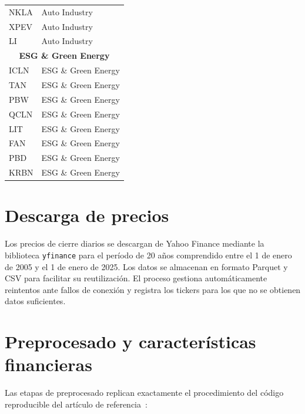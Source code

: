 \begin{longtable}{ll}
NKLA & Auto Industry \\
XPEV & Auto Industry \\
LI   & Auto Industry \\
\multicolumn{2}{c}{\textbf{ESG \& Green Energy}} \\
ICLN & ESG \& Green Energy \\
TAN  & ESG \& Green Energy \\
PBW  & ESG \& Green Energy \\
QCLN & ESG \& Green Energy \\
LIT  & ESG \& Green Energy \\
FAN  & ESG \& Green Energy \\
PBD  & ESG \& Green Energy \\
KRBN & ESG \& Green Energy \\
\end{longtable}

\section{Descarga de precios}
\label{ap:sec:descarga_precios}

Los precios de cierre diarios se descargan de Yahoo Finance mediante la biblioteca \texttt{yfinance} para el período de 20 años comprendido entre el 1 de enero de 2005 y el 1 de enero de 2025. Los datos se almacenan en formato Parquet y CSV para facilitar su reutilización. El proceso gestiona automáticamente reintentos ante fallos de conexión y registra los tickers para los que no se obtienen datos suficientes.

\section{Preprocesado y características financieras}
\label{ap:sec:preprocesado}

Las etapas de preprocesado replican exactamente el procedimiento del código reproducible del artículo de referencia~\cite{arian2025qhrp}:

